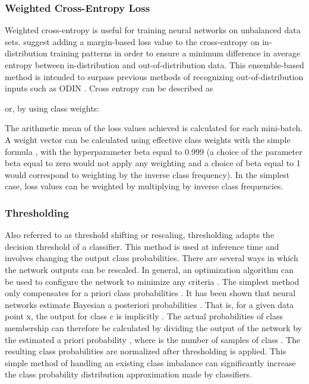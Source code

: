\documentclass[journal]{IEEEtran}
\begin{document}
\subsubsection{Weighted Cross-Entropy Loss}
Weighted cross-entropy \cite{ronneberger2015u} is useful for training neural networks on unbalanced data sets. \cite{vyas2018out} suggest adding a margin-based loss value to the cross-entropy on in-distribution training patterns in order to ensure a minimum difference in average entropy between in-distribution and out-of-distribution data. This ensemble-based method is intended to surpass previous methods of recognizing out-of-distribution inputs such as ODIN \cite{liang2017enhancing}. Cross entropy can be described as

\small 
\normalsize or, by using class weights:
\small 
\normalsize

The arithmetic mean of the loss values achieved is calculated for each mini-batch. A weight vector can be calculated using effective class weights \cite{cui2019class} with the simple formula
,
with the hyperparameter beta equal to 0.999 (a choice of the parameter beta equal to zero would not apply any weighting and a choice of beta equal to 1 would correspond to weighting by the inverse class frequency). In the simplest case, loss values can be weighted by multiplying by inverse class frequencies.

\subsubsection{Thresholding}
Also referred to as threshold shifting or rescaling, thresholding adapts the decision threshold of a classifier. This method is used at inference time and involves changing the output class probabilities. There are several ways in which the network outputs can be rescaled. In general, an optimization algorithm can be used to configure the network to minimize any criteria \cite{lawrence1998neural}. The simplest method only compensates for a priori class probabilities \cite{richard1991neural}. It has been shown that neural networks estimate Bayesian a posteriori probabilities \cite{richard1991neural}. That is, for a given data point x, the output for class c is implicitly
.
The actual probabilities of class membership can therefore be calculated by dividing the output of the network by the estimated a priori probability
,
where  is the number of samples of class  \cite{buda2018systematic}. The resulting class probabilities are normalized after thresholding is applied. This simple method of handling an existing class imbalance can significantly increase the class probability distribution approximation made by classifiers.
\end{document}
